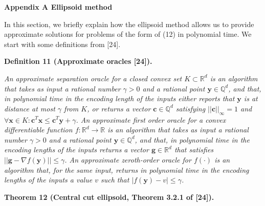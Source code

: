 \documentclass[10pt,a4paper]{article}
\begin{document}
\par\medskip\noindent\textbf{
Appendix A Ellipsoid method}\par




In this section, we briefly explain how the ellipsoid method allows us to provide approximate solutions for problems of the form of (12) in polynomial time. We start with some definitions from [24].\par





\par\medskip\noindent\textbf{
\textbf{Definition 11}\textbf{ }(Approximate oracles [24])\textbf{.}
}\par



\emph{An approximate separation oracle for a closed convex set $K\subset\mathbb{R}^{d}$ is an algorithm that takes as input a rational number $\gamma>0$ and a rational point ${\boldsymbol{y}}\in\mathbb{Q}^{d}$, and that, in polynomial time in the encoding length of the inputs either reports that ${\boldsymbol{y}}$ is at distance at most $\gamma$ from $K$, or returns a vector $\boldsymbol{c}\in\mathbb{Q}^{d}$ satisfying $||\boldsymbol{c}||_{\infty}=1$ and $\forall{\boldsymbol{x}}\in K\colon\boldsymbol{c}^{T}{\boldsymbol{x}}\leq\boldsymbol{c}^{T}{\boldsymbol{y}}+\gamma$. An approximate first order oracle for a convex differentiable function $f:\mathbb{R}^{d}\rightarrow\mathbb{R}$ is an algorithm that takes as input a rational number $\gamma>0$ and a rational point ${\boldsymbol{y}}\in\mathbb{Q}^{d}$, and that, in polynomial time in the encoding lengths of the inputs returns a vector $\boldsymbol{g}\in\mathbb{R}^{d}$ that satisfies $||\boldsymbol{g}-\nabla f({\boldsymbol{y}})||\leq\gamma$. An approximate zeroth-order oracle for $f(\cdot)$ is an algorithm that, for the same input, returns in polynomial time in the encoding lengths of the inputs a value $v$ such that $|f({\boldsymbol{y}})-v|\leq\gamma$.}\par







\par\medskip\noindent\textbf{
\textbf{Theorem 12}\textbf{ }(Central cut ellipsoid, Theorem 3.2.1 of [24])\textbf{.}
}\par
\end{document}
